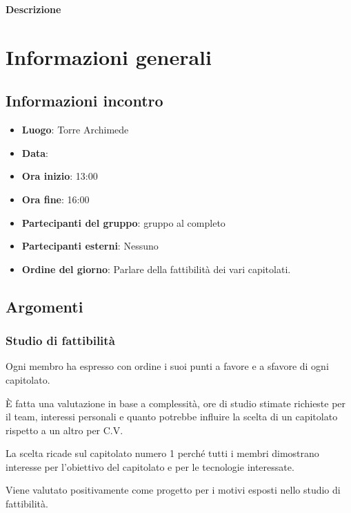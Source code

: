 \documentclass[a4paper, oneside, openany]{article}
\begin{document}
\begin{titlepage}
\begin{center}
        \vspace{1cm}

		\begin{center}
			\textbf{Descrizione\\}
			\DescrizioneDoc
		\end{center}
		
	\end{center}
\end{titlepage}

\restoregeometry
	
	\section{Informazioni generali}
		\subsection{Informazioni incontro}
			\begin{itemize}
				\item { \textbf{Luogo}:  Torre Archimede}
				\item { \textbf{Data}: \Data}
				\item { \textbf{Ora inizio}: 13:00}
				\item { \textbf{Ora fine}: 16:00}
				\item { \textbf{Partecipanti del gruppo}: gruppo al completo}
				\item { \textbf{Partecipanti esterni}: Nessuno}
				\item { \textbf{Ordine del giorno}: Parlare della fattibilità dei vari capitolati.}
			\end{itemize}

        \subsection{Argomenti}
            \subsubsection{Studio di fattibilità}
            Ogni membro ha espresso con ordine i suoi punti a favore e a sfavore di ogni capitolato.\par
            È fatta una valutazione in base a complessità, ore di studio stimate richieste per il team, interessi personali e
            quanto potrebbe influire la scelta di un capitolato rispetto a un altro per C.V.\par
            La scelta ricade sul capitolato numero 1 perché tutti i membri dimostrano interesse per l'obiettivo del capitolato
            e per le tecnologie interessate.\par
            Viene valutato positivamente come progetto per i motivi esposti nello studio di fattibilità.
\end{document}
